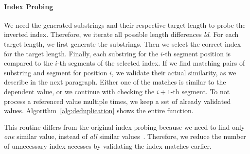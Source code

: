 
\paragraph{Index Probing}
We need the generated substrings and their respective target length to probe the inverted index.
Therefore, we iterate all possible length differences \textit{ld}.
For each target length, we first generate the substrings.
Then we select the correct index for the target length.
Finally, each substring for the $i$-th segment position is compared to the $i$-th segments of the selected index.
If we find matching pairs of substring and segment for position $i$, we validate their actual similarity, as we describe in the next paragraph. %
Either one of the matches is similar to the dependent value, or we continue with checking the $i+1$-th segment.
To not process a referenced value multiple times, we keep a set of already validated values.
Algorithm~\ref{alg:deduplication} shows the entire function.

This routine differs from the original  index probing because we need to find only \emph{one} similar value, instead of \emph{all} similar values~\cite{PassJoin}.
Therefore, we reduce the number of unnecessary index accesses by validating the index matches earlier.

